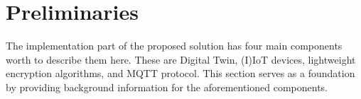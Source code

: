 

\section{Preliminaries}
The implementation part of the proposed solution has four main components worth to describe them here. These are Digital Twin, (I)IoT devices, lightweight encryption algorithms, and MQTT protocol. This section serves as a foundation by providing background information for the aforementioned components.









